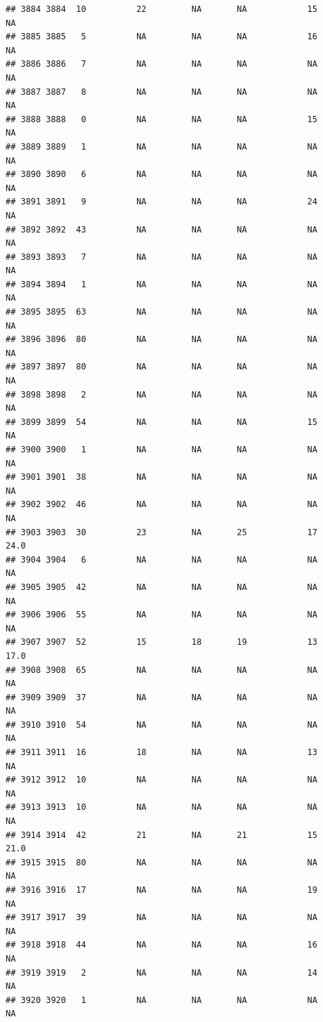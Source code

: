 \documentclass[man]{apa6}
\begin{document}
\begin{verbatim}
## 3884 3884  10          22         NA       NA            15       NA
## 3885 3885   5          NA         NA       NA            16       NA
## 3886 3886   7          NA         NA       NA            NA       NA
## 3887 3887   8          NA         NA       NA            NA       NA
## 3888 3888   0          NA         NA       NA            15       NA
## 3889 3889   1          NA         NA       NA            NA       NA
## 3890 3890   6          NA         NA       NA            NA       NA
## 3891 3891   9          NA         NA       NA            24       NA
## 3892 3892  43          NA         NA       NA            NA       NA
## 3893 3893   7          NA         NA       NA            NA       NA
## 3894 3894   1          NA         NA       NA            NA       NA
## 3895 3895  63          NA         NA       NA            NA       NA
## 3896 3896  80          NA         NA       NA            NA       NA
## 3897 3897  80          NA         NA       NA            NA       NA
## 3898 3898   2          NA         NA       NA            NA       NA
## 3899 3899  54          NA         NA       NA            15       NA
## 3900 3900   1          NA         NA       NA            NA       NA
## 3901 3901  38          NA         NA       NA            NA       NA
## 3902 3902  46          NA         NA       NA            NA       NA
## 3903 3903  30          23         NA       25            17     24.0
## 3904 3904   6          NA         NA       NA            NA       NA
## 3905 3905  42          NA         NA       NA            NA       NA
## 3906 3906  55          NA         NA       NA            NA       NA
## 3907 3907  52          15         18       19            13     17.0
## 3908 3908  65          NA         NA       NA            NA       NA
## 3909 3909  37          NA         NA       NA            NA       NA
## 3910 3910  54          NA         NA       NA            NA       NA
## 3911 3911  16          18         NA       NA            13       NA
## 3912 3912  10          NA         NA       NA            NA       NA
## 3913 3913  10          NA         NA       NA            NA       NA
## 3914 3914  42          21         NA       21            15     21.0
## 3915 3915  80          NA         NA       NA            NA       NA
## 3916 3916  17          NA         NA       NA            19       NA
## 3917 3917  39          NA         NA       NA            NA       NA
## 3918 3918  44          NA         NA       NA            16       NA
## 3919 3919   2          NA         NA       NA            14       NA
## 3920 3920   1          NA         NA       NA            NA       NA

\end{verbatim}
\end{document}
